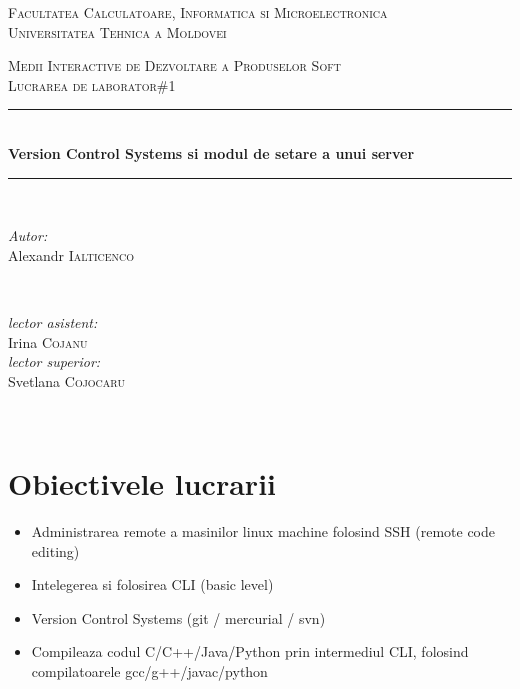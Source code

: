 \documentclass[12pt]{article}
\begin{document}
\begin{titlepage}
\begin{center} 
 \textsc{\large Facultatea Calculatoare, Informatica si Microelectronica}\\[0.5cm]
\textsc{\large Universitatea Tehnica a Moldovei}\\[1.2cm] 
\vspace{25 mm}

\textsc{\Large Medii Interactive de Dezvoltare a Produselor Soft}\\[0.5cm] 
\textsc{\large Lucrarea de laborator\#1}\\[0.5cm] \newcommand{\HRule}{\rule{\linewidth}{0.5mm}} 
  \vspace{10 mm}
  \HRule \\[0.4cm]
  { \LARGE \bfseries Version Control Systems si modul de setare a unui server  }\\[0.4cm] 
  \HRule \\[1.5cm]
      \vspace{30mm}

      \begin{minipage}{0.4\textwidth}
      \begin{flushleft} \large
      \emph{Autor:}\\
      Alexandr \textsc{Ialticenco}
      \end{flushleft}
      \end{minipage}
      ~
      \begin{minipage}{0.4\textwidth}
      \begin{flushright} \large
      \emph{lector asistent:} \\
      Irina \textsc{Cojanu} \\ 
      \emph{lector superior:} \\
      Svetlana \textsc{Cojocaru} 
      \end{flushright}
      \end{minipage}\\[4cm]

      \vspace{5 mm}

      \vfill
      \end{center}
      
\end{titlepage}
\section*{Obiectivele lucrarii}
\begin{itemize}
\item Administrarea remote a masinilor linux machine folosind SSH (remote code editing)
\item Intelegerea si folosirea CLI (basic level)
\item Version Control Systems (git / mercurial / svn)
\item Compileaza codul C/C++/Java/Python prin intermediul CLI, folosind compilatoarele gcc/g++/javac/python
\end{itemize}
\end{document}

